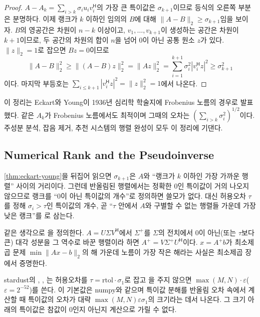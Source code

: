 \begin{proof}
$A-A_k=\sum_{i>k}\sigma_iu_iv_i^{\mathsf H}$의 가장 큰 특이값은 $\sigma_{k+1}$이므로 등식의 오른쪽 부분은 분명하다. 이제 랭크가 $k$ 이하인 임의의 $B$에 대해 $\|A-B\|_2\ge\sigma_{k+1}$임을 보이자. $B$의 영공간은 차원이 $n-k$ 이상이고, $v_1,\dots,v_{k+1}$이 생성하는 공간은 차원이 $k+1$이므로, 두 공간의 차원의 합이 $n$을 넘어 $0$이 아닌 공통 원소 $z$가 있다. $\|z\|_2=1$로 잡으면 $Bz=0$이므로
\[
\|A-B\|_2^2\ge\|(A-B)z\|_2^2=\|Az\|_2^2=\sum_{i=1}^{k+1}\sigma_i^2|v_i^{\mathsf H}z|^2\ge\sigma_{k+1}^2
\]
이다. 마지막 부등호는 $\sum_{i\le k+1}|v_i^{\mathsf H}z|^2=\|z\|_2^2=1$에서 나온다.
\end{proof}

이 정리는 Eckart와 Young이 1936년 심리학 학술지에 Frobenius 노름의 경우로 발표했다\cite{eckart1936young}. 같은 $A_k$가 Frobenius 노름에서도 최적이며 그때의 오차는 $(\sum_{i>k}\sigma_i^2)^{1/2}$이다. 주성분 분석, 잡음 제거, 추천 시스템의 행렬 완성이 모두 이 정리에 기댄다.

\subsection{Numerical Rank and the Pseudoinverse}

\cref{thm:eckart-young}을 뒤집어 읽으면 $\sigma_{k+1}$은 $A$와 ``랭크가 $k$ 이하인 가장 가까운 행렬'' 사이의 거리이다. 그런데 반올림된 행렬에서는 정확한 $0$인 특이값이 거의 나오지 않으므로 랭크를 ``$0$이 아닌 특이값의 개수''로 정의하면 쓸모가 없다. 대신 허용오차 $\tau$를 정해 $\sigma_i>\tau$인 특이값의 개수, 곧 ``$\tau$ 안에서 $A$와 구별할 수 없는 행렬들 가운데 가장 낮은 랭크''를 로 삼는다.

같은 생각으로 을 정의한다. $A=U\Sigma V^{\mathsf H}$에서 $\Sigma^+$를 $\Sigma$의 전치에서 $0$이 아닌(또는 $\tau$보다 큰) 대각 성분을 그 역수로 바꾼 행렬이라 하면 $A^+=V\Sigma^+U^{\mathsf H}$이다. $x=A^+b$가 최소제곱 문제 $\min\|Ax-b\|_2$의 해 가운데 노름이 가장 작은 해라는 사실은 최소제곱 장에서 증명한다.

\begin{instardust}
stardust의 , , 는 허용오차를 $\tau=\mathrm{rtol}\cdot\sigma_1$로 잡고 을 주지 않으면 $\max(M,N)\cdot\varepsilon$($\varepsilon=2^{-52}$)를 쓴다. 이 기본값은 numpy와 같으며 특이값 분해를 반올림 오차 속에서 계산할 때 특이값의 오차가 대략 $\max(M,N)\varepsilon\sigma_1$의 크기라는 데서 나온다. 그 크기 아래의 특이값은 참값이 $0$인지 아닌지 계산으로 가릴 수 없다.
\end{instardust}

